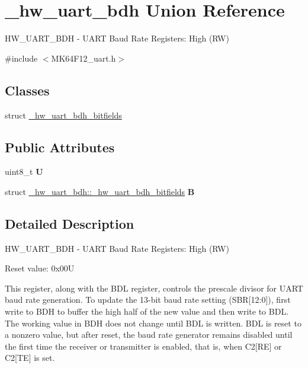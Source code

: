\hypertarget{union__hw__uart__bdh}{}\section{\+\_\+hw\+\_\+uart\+\_\+bdh Union Reference}
\label{union__hw__uart__bdh}


H\+W\+\_\+\+U\+A\+R\+T\+\_\+\+B\+DH -\/ U\+A\+RT Baud Rate Registers\+: High (RW)  




{\ttfamily \#include $<$M\+K64\+F12\+\_\+uart.\+h$>$}

\subsection*{Classes}
\begin{DoxyCompactItemize}
\item 
struct \hyperlink{struct__hw__uart__bdh_1_1__hw__uart__bdh__bitfields}{\+\_\+hw\+\_\+uart\+\_\+bdh\+\_\+bitfields}
\end{DoxyCompactItemize}
\subsection*{Public Attributes}
\begin{DoxyCompactItemize}
\item 
uint8\+\_\+t {\bfseries U}\hypertarget{union__hw__uart__bdh_a0c1197d0576eeace74486d8bc5e81312}{}\label{union__hw__uart__bdh_a0c1197d0576eeace74486d8bc5e81312}

\item 
struct \hyperlink{struct__hw__uart__bdh_1_1__hw__uart__bdh__bitfields}{\+\_\+hw\+\_\+uart\+\_\+bdh\+::\+\_\+hw\+\_\+uart\+\_\+bdh\+\_\+bitfields} {\bfseries B}\hypertarget{union__hw__uart__bdh_ab5e8b8b0f7768a7b6718fb651d68e2e1}{}\label{union__hw__uart__bdh_ab5e8b8b0f7768a7b6718fb651d68e2e1}

\end{DoxyCompactItemize}


\subsection{Detailed Description}
H\+W\+\_\+\+U\+A\+R\+T\+\_\+\+B\+DH -\/ U\+A\+RT Baud Rate Registers\+: High (RW) 

Reset value\+: 0x00U

This register, along with the B\+DL register, controls the prescale divisor for U\+A\+RT baud rate generation. To update the 13-\/bit baud rate setting (S\+BR\mbox{[}12\+:0\mbox{]}), first write to B\+DH to buffer the high half of the new value and then write to B\+DL. The working value in B\+DH does not change until B\+DL is written. B\+DL is reset to a nonzero value, but after reset, the baud rate generator remains disabled until the first time the receiver or transmitter is enabled, that is, when C2\mbox{[}RE\mbox{]} or C2\mbox{[}TE\mbox{]} is set. 

